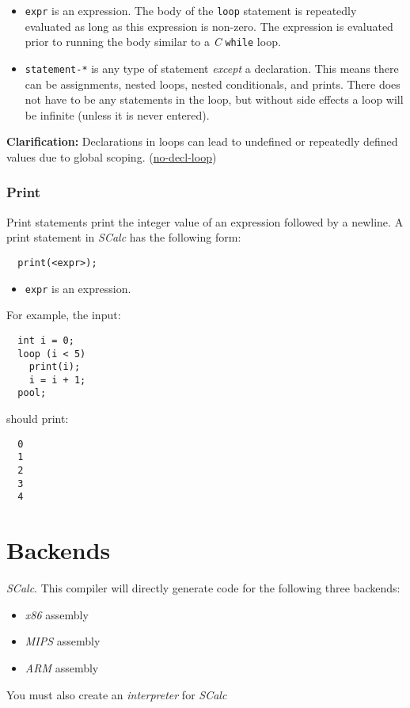 \documentclass{article}
\newcommand{\code}[1]{\texttt{\textmd{#1}}}
\newcommand{\clarification}[2]{\textbf{Clarification: }#1 (\hyperlink{#2}{#2})}
\begin{document}
\begin {itemize}
  \item
  \code{expr} is an expression. The body of the \code{loop} statement is repeatedly evaluated as
  long as this expression is non-zero. The expression is evaluated prior to running the body
  similar to a \textit{C} \code{while} loop.
  \item
    \code{statement-*} is any type of statement \textit{except} a declaration. This means there can
    be assignments, nested loops, nested conditionals, and prints. There does not have to be any
    statements in the loop, but without side effects a loop will be infinite (unless it is never
    entered).
\end{itemize}

\clarification{Declarations in loops can lead to undefined or repeatedly defined values due to
global scoping.} {no-decl-loop}

\subsubsection{Print}
\label{sssec:print}
Print statements print the integer value of an expression followed by a newline. A print statement
in \textit{SCalc} has the following form:
\begin{lstlisting}
  print(<expr>);
\end{lstlisting}

\begin{itemize}
  \item \code{expr} is an expression.
\end{itemize}

For example, the input:
\begin{lstlisting}
  int i = 0;
  loop (i < 5)
    print(i);
    i = i + 1;
  pool;
\end{lstlisting}
should print:
\begin{lstlisting}
  0
  1
  2
  3
  4
\end{lstlisting}

\section{Backends}

\textit{SCalc}. This compiler will directly generate code for the following three backends:
\begin {itemize}
  \item \textit{x86} assembly
  \item \textit{MIPS} assembly
  \item \textit{ARM} assembly
\end {itemize}
You must also create an \textit{interpreter} for \textit{SCalc}
\end{document}
